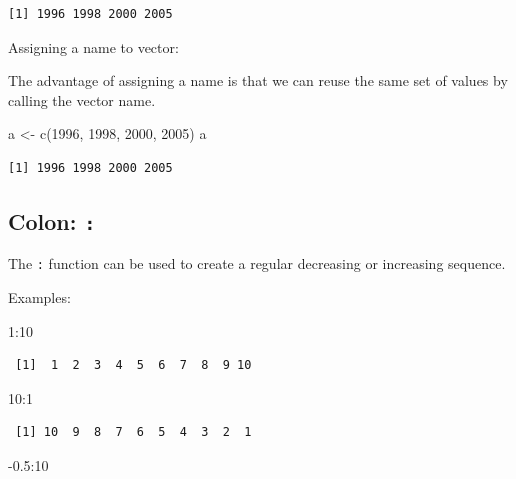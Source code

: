 \documentclass[
  letterpaper,
  DIV=11,
  numbers=noendperiod]{scrreprt}
\newenvironment{Shaded}{\begin{snugshade}}{\end{snugshade}}
\newcommand{\DecValTok}[1]{\textcolor[rgb]{0.68,0.00,0.00}{#1}}
\newcommand{\FloatTok}[1]{\textcolor[rgb]{0.68,0.00,0.00}{#1}}
\newcommand{\FunctionTok}[1]{\textcolor[rgb]{0.28,0.35,0.67}{#1}}
\newcommand{\NormalTok}[1]{\textcolor[rgb]{0.00,0.23,0.31}{#1}}
\newcommand{\OtherTok}[1]{\textcolor[rgb]{0.00,0.23,0.31}{#1}}
\newcommand{\SpecialCharTok}[1]{\textcolor[rgb]{0.37,0.37,0.37}{#1}}
\begin{document}
\begin{verbatim}
[1] 1996 1998 2000 2005
\end{verbatim}

Assigning a name to vector:

The advantage of assigning a name is that we can reuse the same set of
values by calling the vector name.

\begin{Shaded}
\begin{Highlighting}[]
\NormalTok{a }\OtherTok{\textless{}{-}} \FunctionTok{c}\NormalTok{(}\DecValTok{1996}\NormalTok{, }\DecValTok{1998}\NormalTok{, }\DecValTok{2000}\NormalTok{, }\DecValTok{2005}\NormalTok{)}
\NormalTok{a}
\end{Highlighting}
\end{Shaded}

\begin{verbatim}
[1] 1996 1998 2000 2005
\end{verbatim}

\subsection{\texorpdfstring{Colon: \texttt{:}}{Colon: :}}\label{colon}

The \texttt{:} function can be used to create a regular decreasing or
increasing sequence.

Examples:

\begin{Shaded}
\begin{Highlighting}[]
\DecValTok{1}\SpecialCharTok{:}\DecValTok{10}
\end{Highlighting}
\end{Shaded}

\begin{verbatim}
 [1]  1  2  3  4  5  6  7  8  9 10
\end{verbatim}

\begin{Shaded}
\begin{Highlighting}[]
\DecValTok{10}\SpecialCharTok{:}\DecValTok{1}
\end{Highlighting}
\end{Shaded}

\begin{verbatim}
 [1] 10  9  8  7  6  5  4  3  2  1
\end{verbatim}

\begin{Shaded}
\begin{Highlighting}[]
\SpecialCharTok{{-}}\FloatTok{0.5}\SpecialCharTok{:}\DecValTok{10}
\end{Highlighting}
\end{Shaded}
\end{document}
